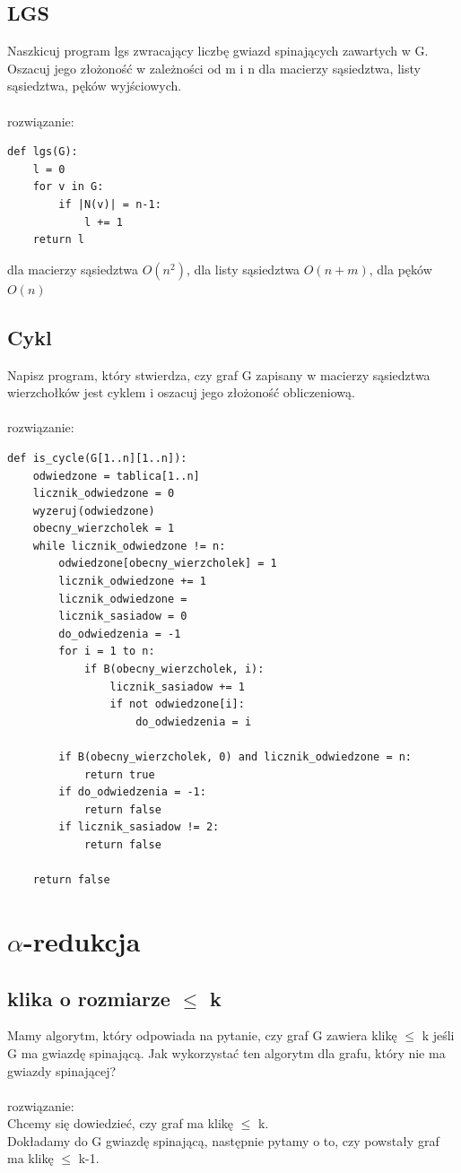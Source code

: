 \documentclass{article}
\begin{document}
\subsection*{LGS}
Naszkicuj program lgs zwracający liczbę gwiazd spinających zawartych w G. Oszacuj jego złożoność w zależności od m i n 
dla macierzy sąsiedztwa, listy sąsiedztwa, pęków wyjściowych. \\\\rozwiązanie:\\

\begin{lstlisting}
def lgs(G):
	l = 0
	for v in G:
		if |N(v)| = n-1:
			l += 1
	return l
\end{lstlisting}
dla macierzy sąsiedztwa $O(n^2)$, dla listy sąsiedztwa $O(n + m)$, dla pęków $O(n)$

\subsection*{Cykl}
Napisz program, który stwierdza, czy graf G zapisany w macierzy sąsiedztwa wierzchołków jest cyklem i oszacuj jego złożoność obliczeniową. \\\\rozwiązanie:\\
\begin{lstlisting}
def is_cycle(G[1..n][1..n]):
	odwiedzone = tablica[1..n]
	licznik_odwiedzone = 0
	wyzeruj(odwiedzone)
	obecny_wierzcholek = 1
	while licznik_odwiedzone != n:
		odwiedzone[obecny_wierzcholek] = 1
		licznik_odwiedzone += 1
		licznik_odwiedzone = 
		licznik_sasiadow = 0
		do_odwiedzenia = -1
		for i = 1 to n:
			if B(obecny_wierzcholek, i):
				licznik_sasiadow += 1
				if not odwiedzone[i]:
					do_odwiedzenia = i

		if B(obecny_wierzcholek, 0) and licznik_odwiedzone = n:
			return true
		if do_odwiedzenia = -1:
			return false
		if licznik_sasiadow != 2:
			return false
	
	return false 
\end{lstlisting}

\section{$\alpha$-redukcja}
\subsection*{klika o rozmiarze $\leq$ k}
Mamy algorytm, który odpowiada na pytanie, czy graf G zawiera klikę $\leq$ k jeśli G ma gwiazdę spinającą.
Jak wykorzystać ten algorytm dla grafu, który nie ma gwiazdy spinającej? \\\\rozwiązanie:\\
Chcemy się dowiedzieć, czy graf ma klikę $\leq$ k. \\
Dokładamy do G gwiazdę spinającą, następnie pytamy o to, czy powstały graf ma klikę $\leq$ k-1.
\end{document}

